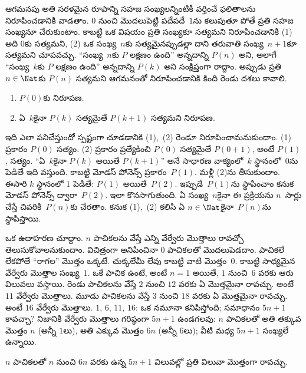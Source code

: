 \documentclass[../../../include/open-logic-section]{subfiles}
\begin{document}


ఆగమనపు అతి సరళమైన రూపాన్ని సహజ సంఖ్యలన్నింటికీ
వర్తించే ఫలితాలను నిరూపించడానికి వాడతాం. $0$ నుంచి మొదలుపెట్టి
పదేపదే~$1$ను కలుపుతూ పోతే ప్రతి సహజ సంఖ్యనూ చేరుకుంటాం.
కాబట్టి ఒక విషయం ప్రతి సంఖ్యకూ సత్యమని నిరూపించడానికి
(1) అది $0$కు సత్యమని, (2) ఒక సంఖ్య~$n$కు సత్యమైనప్పుడల్లా
దాని తరువాతి సంఖ్య~$n+1$కూ సత్యమని చూపవచ్చు.
``సంఖ్య~$n$కు $P$ లక్షణం ఉంది'' అన్నదాన్ని $P(n)$ అని,
అలాగే ``సంఖ్య~$k$కు $P$ లక్షణం ఉంది'' అన్నదాన్ని $P(k)$ అని
సంక్షిప్తంగా రాద్దాం. అప్పుడు ప్రతి $n \in \Nat$కు $P(n)$ సత్యమని
ఆగమనంతో నిరూపించడానికి కింది రెండు దశలు కావాలి.
\begin{enumerate}
\item $P(0)$కు నిరూపణ.
\item ఏ~$k$కైనా $P(k)$ సత్యమైతే $P(k+1)$ సత్యమని నిరూపణ.
\end{enumerate}
ఇది ఎలా పనిచేస్తుందో స్పష్టంగా చూడడానికి (1),~(2) రెండూ నిరూపించామనుకుందాం. (1) ప్రకారం $P(0)$ సత్యం. (2) ప్రకారం ప్రత్యేకించి $P(0)$ సత్యమైతే $P(0+1)$, అంటే $P(1)$, సత్యం. ``ఏ~$k$కైనా $P(k)$ అయితే $P(k+1)$'' అనే సాధారణ వాక్యంలో~$k$ స్థానంలో~$0$ను పెడితే ఇది వస్తుంది. కాబట్టి మోడస్ పోనెన్స్ ప్రకారం~$P(1)$. మళ్లీ (2)ను తీసుకుందాం. ఈసారి $k$ స్థానంలో $1$ పెడితే: $P(1)$ అయితే~$P(2)$. ఇప్పుడే~$P(1)$ను స్థాపించాం కనుక మోడస్ పోనెన్స్ ద్వారా~$P(2)$. ఇలా కొనసాగుతుంది. ఏ సంఖ్య~$n$కైనా ఈ ప్రక్రియను $n$~సార్లు చేస్తే చివరికి~$P(n)$కు చేరతాం. కనుక (1),~(2) కలిసి ఏ $n
\in \Nat$కైనా~$P(n)$ను స్థాపిస్తాయి.

ఒక ఉదాహరణ చూద్దాం. $n$ పాచికలను వేస్తే ఎన్ని వేర్వేరు మొత్తాలు రావచ్చో తెలుసుకోవాలనుకుందాం. విచిత్రంగా అనిపించినా $0$ పాచికలతో మొదలుపెడదాం. పాచికలే లేకపోతే ``రాగల'' మొత్తం ఒక్కటే. చుక్కలేమీ లేవు కాబట్టి వాటి మొత్తం~$0$. కాబట్టి సాధ్యమైన వేర్వేరు మొత్తాల సంఖ్య~$1$. ఒకే పాచిక ఉంటే, అంటే $n=1$ అయితే, $1$ నుంచి~$6$ వరకు ఆరు విలువలు వస్తాయి. రెండు పాచికలను వేస్తే $2$ నుంచి $12$ వరకు ఏ మొత్తమైనా రావచ్చు. అంటే $11$ వేర్వేరు మొత్తాలు. మూడు పాచికలను వేస్తే $3$ నుంచి $18$ వరకు ఏ మొత్తమైనా రావచ్చు. అంటే $16$ వేర్వేరు మొత్తాలు. $1$, $6$, $11$, $16$: ఒక నమూనా కనిపిస్తోంది; సమాధానం $5n+1$ కావచ్చా? నిజానికి వేర్వేరు మొత్తాలు గరిష్ఠంగా $5n+1$ ఉండగలవు: $n$ పాచికలతో అతి తక్కువ మొత్తం $n$ (అన్నీ $1$లు), అతి ఎక్కువ మొత్తం $6n$ (అన్నీ $6$లు); వీటి మధ్య $5n+1$ సంఖ్యలే ఉన్నాయి.

\begin{thm}
  $n$ పాచికలతో $n$ నుంచి $6n$ వరకు ఉన్న $5n+1$ విలువల్లో ప్రతి విలువా మొత్తంగా రావచ్చు.
\end{thm}
\end{document}
